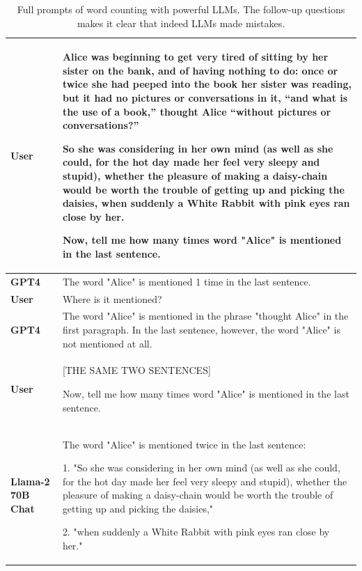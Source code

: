 \documentclass{article}
\begin{document}
\begin{table}[h!]
    \caption{Full prompts of word counting with powerful LLMs. The follow-up questions makes it clear that indeed LLMs made mistakes.}
    \label{tab:prompt_full}
    \centering
    \small
    \begin{tabular}{m{1.4cm}m{11.5cm}}
    \toprule
    \bf User & Alice was beginning to get very tired of sitting by her sister on the bank, and of having nothing to do: once or twice she had peeped into the book her sister was reading, but it had no pictures or conversations in it, “and what is the use of a book,” thought Alice “without pictures or conversations?”
    \newline

    So she was considering in her own mind (as well as she could, for the hot day made her feel very sleepy and stupid), whether the pleasure of making a daisy-chain would be worth the trouble of getting up and picking the daisies, when suddenly a White Rabbit with pink eyes ran close by her.
    \newline

    Now, tell me how many times word "Alice" is mentioned in the last sentence. \\
    \midrule
    \bf GPT4 & The word "Alice" is mentioned 1 time in the last sentence. \\
    \midrule
    \bf User & Where is it mentioned? \\
    \midrule
    \bf GPT4 & The word "Alice" is mentioned in the phrase "thought Alice" in the first paragraph. In the last sentence, however, the word "Alice" is not mentioned at all. \\
    \midrule
    \midrule
    \bf User & [THE SAME TWO SENTENCES]
    \newline

    Now, tell me how many times word "Alice" is mentioned in the last sentence. \\
    \midrule    
    \bf Llama-2 70B Chat & The word "Alice" is mentioned twice in the last sentence:
    \newline

    1. "So she was considering in her own mind (as well as she could, for the hot day made her feel very sleepy and stupid), whether the pleasure of making a daisy-chain would be worth the trouble of getting up and picking the daisies,"
    
    2. "when suddenly a White Rabbit with pink eyes ran close by her."
    \newline
    

\end{tabular}
\end{table}
\end{document}
